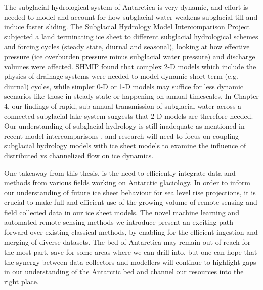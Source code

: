 The subglacial hydrological system of Antarctica is very dynamic, and effort is needed to model and account for how subglacial water weakens subglacial till and induce faster sliding.
The Subglacial Hydrology Model Intercomparison Project \citep[SHMIP;][]{DeFleurianSHMIPsubglacialhydrology2018} subjected a land terminating ice sheet to different subglacial hydrological schemes and forcing cycles (steady state, diurnal and seasonal), looking at how effective pressure (ice overburden pressure minus subglacial water pressure) and discharge volumes were affected.
SHMIP found that complex 2-D models which include the physics of drainage systems were needed to model dynamic short term (e.g. diurnal) cycles, while simpler 0-D or 1-D models may suffice for less dynamic scenarios like those in steady state or happening on annual timescales.
In Chapter 4, our findings of rapid, sub-annual transmission of subglacial water across a connected subglacial lake system suggests that 2-D models are therefore needed. %
Our understanding of subglacial hydrology is still inadequate as mentioned in recent model intercomparisons \citep[ISMIP6; ][]{SeroussiISMIP6Antarcticamultimodel2020}, and research will need to focus on coupling subglacial hydrology models with ice sheet models \citep[e.g.][]{SommersSHAKTISubglacialHydrology2018,Smith-Johnsenrolesubglacialhydrology2020} to examine the influence of distributed vs channelized flow on ice dynamics.

One takeaway from this thesis, is the need to efficiently integrate data and methods from various fields working on Antarctic glaciology.
In order to inform our understanding of future ice sheet behaviour for sea level rise projections, it is crucial to make full and efficient use of the growing volume of remote sensing and field collected data in our ice sheet models.
The novel machine learning and automated remote sensing methods we introduce present an exciting path forward over existing classical methods, by enabling for the efficient ingestion and merging of diverse datasets.
The bed of Antarctica may remain out of reach for the most part, save for some areas where we can drill into, but one can hope that the synergy between data collectors and modellers will continue to highlight gaps in our understanding of the Antarctic bed and channel our resources into the right place.

